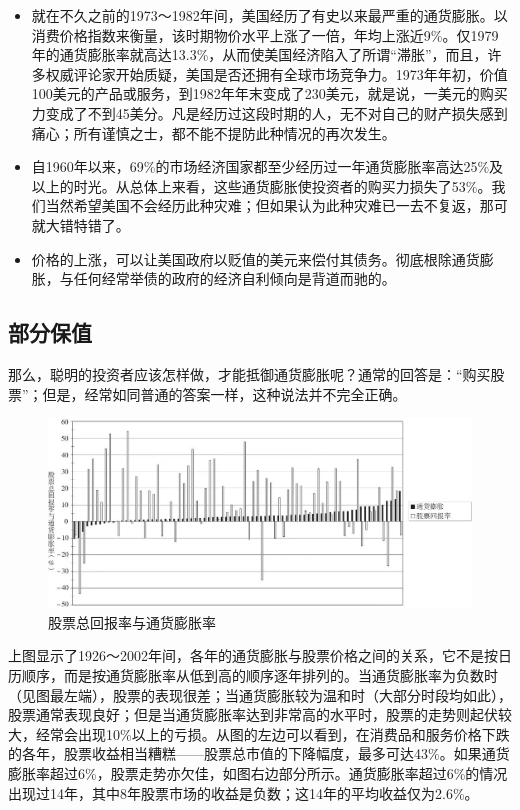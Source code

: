 \documentclass[12pt,oneside]{book}
\begin{document}
\begin{itemize}
\item 就在不久之前的1973～1982年间，美国经历了有史以来最严重的通货膨胀。以消费价格指数来衡量，该时期物价水平上涨了一倍，年均上涨近9\%。仅1979年的通货膨胀率就高达13.3\%，从而使美国经济陷入了所谓“滞胀”，而且，许多权威评论家开始质疑，美国是否还拥有全球市场竞争力。1973年年初，价值100美元的产品或服务，到1982年年末变成了230美元，就是说，一美元的购买力变成了不到45美分。凡是经历过这段时期的人，无不对自己的财产损失感到痛心；所有谨慎之士，都不能不提防此种情况的再次发生。
\item 自1960年以来，69\%的市场经济国家都至少经历过一年通货膨胀率高达25\%及以上的时光。从总体上来看，这些通货膨胀使投资者的购买力损失了53\%。我们当然希望美国不会经历此种灾难；但如果认为此种灾难已一去不复返，那可就大错特错了。
\item 价格的上涨，可以让美国政府以贬值的美元来偿付其债务。彻底根除通货膨胀，与任何经常举债的政府的经济自利倾向是背道而驰的。
\end{itemize}


\subsection{部分保值}
那么，聪明的投资者应该怎样做，才能抵御通货膨胀呢？通常的回答是：“购买股票”；但是，经常如同普通的答案一样，这种说法并不完全正确。


\begin{figure}[H]
\centering
\includegraphics[width=\linewidth ,totalheight=0.95\textheight , keepaspectratio]{股票总回报率与通货膨胀率.jpg}
\caption{股票总回报率与通货膨胀率}
\end{figure}

上图显示了1926～2002年间，各年的通货膨胀与股票价格之间的关系，它不是按日历顺序，而是按通货膨胀率从低到高的顺序逐年排列的。当通货膨胀率为负数时（见图最左端），股票的表现很差；当通货膨胀较为温和时（大部分时段均如此），股票通常表现良好；但是当通货膨胀率达到非常高的水平时，股票的走势则起伏较大，经常会出现10\%以上的亏损。从图的左边可以看到，在消费品和服务价格下跌的各年，股票收益相当糟糕——股票总市值的下降幅度，最多可达43\%。如果通货膨胀率超过6\%，股票走势亦欠佳，如图右边部分所示。通货膨胀率超过6\%的情况出现过14年，其中8年股票市场的收益是负数；这14年的平均收益仅为2.6\%。
\end{document}
